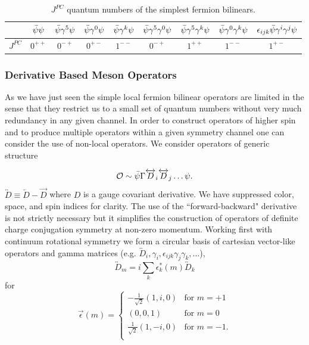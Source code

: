 \begin{table}[hbtp]
\begin{centering}
\caption{$J^{PC}$ quantum numbers of the simplest fermion bilinears.  }\label{tab::JPCSimpleOps}
\begin{tabular}{ccccccccc}
& $\bar{\psi} \psi$ & $\bar{\psi} \gamma^5 \psi$ & $\bar{\psi} \gamma^0\psi$ & $\bar{\psi} \gamma^k\psi$ & $\bar{\psi} \gamma^5\gamma^0\psi$ & $\bar{\psi} \gamma^5 \gamma^k\psi$ & $\bar{\psi} \gamma^0 \gamma^k\psi$ & $\epsilon_{ijk} \bar{\psi} \gamma^i \gamma^j\psi$ \\ \hline
$J^{PC}$ & $0^{++}$ &$0^{-+}$ &$0^{+-}$ &$1^{--}$ &$0^{-+}$ &$1^{++}$ &$1^{--}$ &$1^{+-}$ 
\end{tabular}
\end{centering}
\end{table}


\subsubsection{Derivative Based Meson Operators}
As we have just seen the simple local fermion bilinear operators are limited in the sense that they restrict us to a small set of quantum numbers without very much redundancy in any given channel. In order to construct operators of higher spin and to produce multiple operators within a given symmetry channel one can consider the use of non-local operators. We consider operators of generic structure 

\begin{equation*}
\mathcal{O} \sim \bar{\psi} \Gamma \overleftrightarrow{D}_i \overleftrightarrow{D}_j \ldots \psi.
\end{equation*} 
$\overleftrightarrow{D} \equiv \overleftarrow{D} - \overrightarrow{D}$ where $D$ is a gauge covariant derivative. We have suppressed color, space, and spin indices for clarity. The use of the ``forward-backward" derivative is not strictly necessary but it simplifies the construction of operators of definite charge conjugation symmetry at non-zero momentum. Working first with continuum rotational symmetry we form a circular basis of cartesian vector-like operators and gamma matrices (e.g. $\overleftrightarrow{D}_i, \gamma_i, \epsilon_{ijk}\gamma_j\gamma_k, \ldots$),  
\begin{equation*}
\overleftrightarrow{D}_m = i\sum_k \epsilon^*_k(m) \overleftrightarrow{D}_k
\end{equation*}
for 
\begin{equation*}
\vec{\epsilon}(m) = \begin{cases} - \frac{1}{\sqrt{2}} (1,  i, 0) & \mbox{for } m = +1 \\
(0, 0 , 1) & \mbox{for } m = 0 \\
 \frac{1}{\sqrt{2}} (1, - i, 0) & \mbox{for } m = -1. \\
\end{cases}
\end{equation*}

